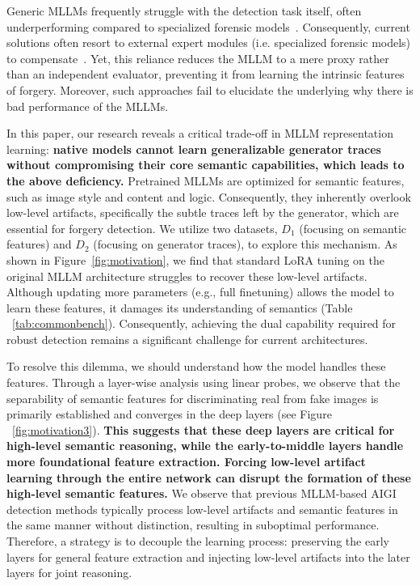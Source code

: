 \documentclass{article}
\theoremstyle{plain}
\theoremstyle{definition}
\theoremstyle{remark}
\begin{document}
Generic MLLMs frequently struggle with the detection task itself, often underperforming compared to specialized forensic models~\citep{jia2024can}. 
Consequently, current solutions often resort to external expert modules (i.e. specialized forensic models) to compensate~\citep{chen2024x2,zhou2025aigi}. 
Yet, this reliance reduces the MLLM to a mere proxy rather than an independent evaluator, preventing it from learning the intrinsic features of forgery. 
Moreover, such approaches fail to elucidate the underlying why there is bad performance of the MLLMs.


In this paper, our research reveals a critical trade-off in MLLM representation learning: \textbf{native models cannot learn generalizable generator traces without compromising their core semantic capabilities, which leads to the above deficiency.}
Pretrained MLLMs are optimized for semantic features, such as image style and content and logic. 
Consequently, they inherently overlook low-level artifacts, specifically the subtle traces left by the generator, which are essential for forgery detection.
We utilize two datasets, $D_1$ (focusing on semantic features) and $D_2$ (focusing on generator traces), to explore this mechanism. 
As shown in Figure~\ref{fig:motivation}, we find that standard LoRA tuning on the original MLLM architecture struggles to recover these low-level artifacts.
Although updating more parameters (e.g., full finetuning) allows the model to learn these features, it damages its understanding of semantics (Table ~\ref{tab:commonbench}).
Consequently, achieving the dual capability required for robust detection remains a significant challenge for current architectures.


To resolve this dilemma, we should understand how the model handles these features. 
Through a layer-wise analysis using linear probes, we observe that the separability of semantic features for discriminating real from fake images is primarily established and converges in the deep layers (see Figure ~\ref{fig:motivation3}).
\textbf{This suggests that these deep layers are critical for high-level semantic reasoning, while the early-to-middle layers handle more foundational feature extraction. Forcing low-level artifact learning through the entire network can disrupt the formation of these high-level semantic features. }
We observe that previous MLLM-based AIGI detection methods typically process low-level artifacts and semantic features in the same manner without distinction, resulting in suboptimal performance.
Therefore, a strategy is to decouple the learning process: preserving the early layers for general feature extraction and injecting low-level artifacts into the later layers for joint reasoning.
\end{document}
